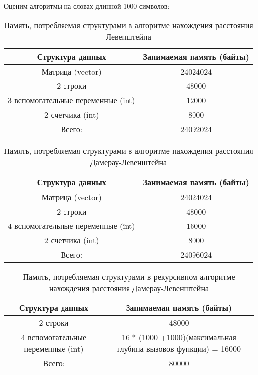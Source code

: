 \documentclass[a4paper, 14pt]{article}
\begin{document}
	Оценим алгоритмы на словах длинной 1000 символов:\\
	
\begin{table}[H]
\begin{center}
\caption{Память, потребляемая структурами в алгоритме нахождения расстояния Левенштейна}
	\begin{tabular}{|c|c|}
	\hline 
	Структура данных & Занимаемая память (байты) \\ 
	\hline 
	Матрица (vector) & 24024024 \\ 
	\hline 
	2 строки & 48000 \\ 
	\hline 
	3 вспомогательные переменные (int) & 12000 \\ 
	\hline 
	2 счетчика (int) & 8000 \\ 
	\hline 
	Всего: & 24092024 \\ 
	\hline 
	\end{tabular} 
	\end{center}
	\end{table}	
	
\begin{table}[H]
\begin{center}
\caption{Память, потребляемая структурами в алгоритме нахождения расстояния Дамерау-Левенштейна}
	\begin{tabular}{|c|c|}
	\hline 
	Структура данных & Занимаемая память (байты) \\ 
	\hline 
	Матрица (vector) & 24024024  \\ 
	\hline 
	2 строки & 48000 \\ 
	\hline 
	4 вспомогательные переменные (int) & 16000 \\ 
	\hline 
	2 счетчика (int) & 8000 \\ 
	\hline 
	Всего: & 24096024 \\ 
	\hline 
	\end{tabular}
	\end{center}
	\end{table}	
	
\begin{table}[H]
\begin{center}
\caption{Память, потребляемая структурами в рекурсивном алгоритме нахождения расстояния Дамерау-Левенштейна}
	\begin{tabular}{|c|c|}
	\hline 
	Структура данных & Занимаемая память (байты) \\ 
	\hline 
	2 строки & 48000 \\ 
	\hline 
	4 вспомогательные переменные (int) & 16  * (1000 +1000)(максимальная глубина вызовов функции) = 16000\\ 
	\hline 
	Всего: & 80000 \\ 
	\hline 
	\end{tabular}
	\end{center}
	\end{table}	
	
\end{document}
